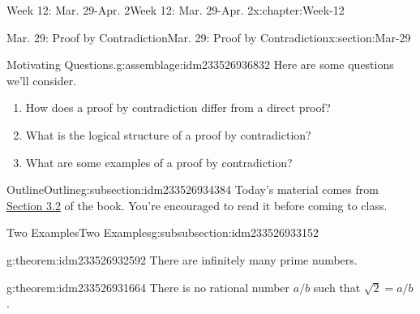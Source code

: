 \documentclass[oneside,10pt,]{book}
\numberwithin{equation}{section}
\begin{document}
\begin{chapterptx}{Week 12: Mar. 29-Apr. 2}{}{Week 12: Mar. 29-Apr. 2}{}{}{x:chapter:Week-12}
%
%
\typeout{************************************************}
\typeout{************************************************}
%
\begin{sectionptx}{Mar. 29: Proof by Contradiction}{}{Mar. 29: Proof by Contradiction}{}{}{x:section:Mar-29}
\begin{introduction}{}%
\begin{assemblage}{Motivating Questions.}{g:assemblage:idm233526936832}%
Here are some questions we'll consider. %
\begin{enumerate}
\item{}How does a proof by contradiction differ from a direct proof?%
\item{}What is the logical structure of a proof by contradiction?%
\item{}What are some examples of a proof by contradiction?%
\end{enumerate}
%
\end{assemblage}
\end{introduction}%
%
%
\typeout{************************************************}
\typeout{************************************************}
%
\begin{subsectionptx}{Outline}{}{Outline}{}{}{g:subsection:idm233526934384}
Today's material comes from \href{http://discrete.openmathbooks.org/dmoi3/sec_logic-proofs.html}{Section 3.2} of the book. You're encouraged to read it before coming to class.%
%
%
\typeout{************************************************}
\typeout{************************************************}
%
\begin{subsubsectionptx}{Two Examples}{}{Two Examples}{}{}{g:subsubsection:idm233526933152}
\begin{theorem}{}{}{g:theorem:idm233526932592}%
There are infinitely many prime numbers.%
\end{theorem}
\begin{theorem}{}{}{g:theorem:idm233526931664}%
There is no rational number \(a/b\) such that \(\sqrt{2} = a/b\).%
\end{theorem}
\end{subsubsectionptx}
%
%
\typeout{************************************************}
\typeout{************************************************}

\end{subsectionptx}
\end{sectionptx}
\end{chapterptx}
\end{document}
